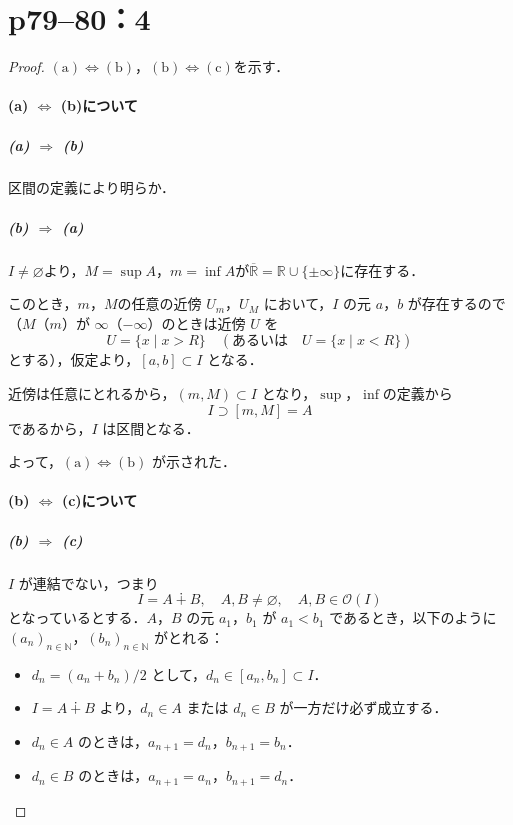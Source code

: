 \section*{p79--80：4} \label{p79--80：4}

\begin{leftbar}
    \begin{proof}
        $(\text{a}) \iff (\text{b})$，$(\text{b}) \iff (\text{c})$を示す．

        \paragraph{(a) $\iff$ (b)について}

        \subparagraph{(a) $\Longrightarrow$ (b)}
        区間の定義により明らか．

        \subparagraph{(b) $\Longrightarrow$ (a)}
        $I \ne \varnothing$より，$M = \sup A$，$m = \inf A$が$\overline{\mathbb{R}}= \mathbb{R} \cup \{ \pm \infty \}$に存在する．

        このとき，$m$，$M$の任意の近傍 $U_m$，$U_M$ において，$I$ の元 $a$，$b$ が存在するので
        （$M$（$m$）が $\infty$（$-\infty$）のときは近傍 $U$ を
        \[
            U = \{ x \mid x > R\}\quad (\text{あるいは}\quad U = \{ x \mid x < R\})
        \]
        とする），仮定より，$[a,b] \subset I$ となる．

        近傍は任意にとれるから，$(m,M) \subset I$ となり，$\sup$，$\inf$の定義から
        \[
            I \supset [m,M] = A
        \]
        であるから，$I$ は区間となる．

        よって，$(\text{a}) \iff (\text{b})$ が示された．

        \paragraph{(b) $\iff$ (c)について}

        \subparagraph{(b) $\Longrightarrow$ (c)}
        $I$ が連結でない，つまり
        \[
            I = A \dotplus B,\quad A,B \ne \varnothing,\quad A , B \in \mathcal{O} (I)
        \]
        となっているとする．$A$，$B$ の元 $a_1$，$b_1$ が $a_1 < b_1$ であるとき，以下のように
        $(a_n)_{n \in \mathbb{N}}$，$(b_n)_{n \in \mathbb{N}}$ がとれる：

        \begin{itemize}
            \item $d_n = (a_n + b_n)/2$ として，$d_n \in [a_n,b_n] \subset I$．
            \item $I= A \dotplus B$ より，$d_n \in A$ または $d_n \in B$ が一方だけ必ず成立する．
            \item $d_n \in A$ のときは，$a_{n+1} = d_n$，$b_{n+1} = b_n$．
            \item $d_n \in B$ のときは，$a_{n+1} = a_n$，$b_{n+1} = d_n$．
        \end{itemize}


\end{proof}
\end{leftbar}
